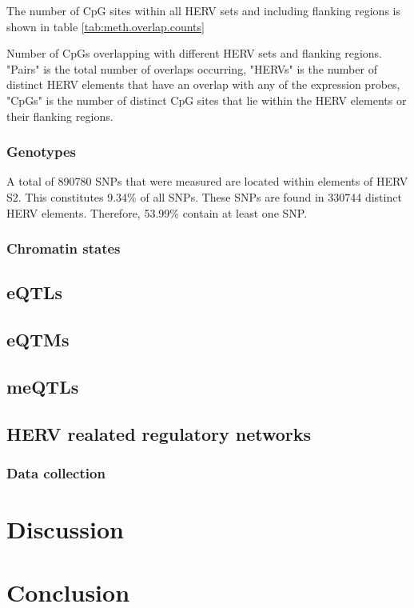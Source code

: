 \documentclass[a4paper,12pt]{article}
\begin{document}
The number of CpG sites within all HERV sets and including flanking regions is shown in table \ref{tab:meth.overlap.counts}

\begin{table}[h!]
  \begin{center}
  \end{center}        
	\caption{Number of CpGs overlapping with different HERV sets and flanking regions. "Pairs" is the total number of overlaps occurring, "HERVs" is the number of distinct HERV elements that have an overlap with any of the expression probes, "CpGs" is the number of distinct CpG sites that lie within the HERV elements or their flanking regions.}
	\label{tab:meth.overlap.counts}
\end{table} 

\subsubsection{Genotypes}
A total of 890780 SNPs that were measured are located within elements of HERV S2. This constitutes 9.34\% of all SNPs. These SNPs are found in 330744 distinct HERV elements. Therefore, 53.99\% contain at least one SNP.
\subsubsection{Chromatin states}

\subsection{eQTLs}

\subsection{eQTMs}

\subsection{meQTLs}

\subsection{HERV realated regulatory networks}
\subsubsection{Data collection}


\newpage
\section{Discussion}

\newpage
\section{Conclusion}

\newpage
{}

\end{document}

